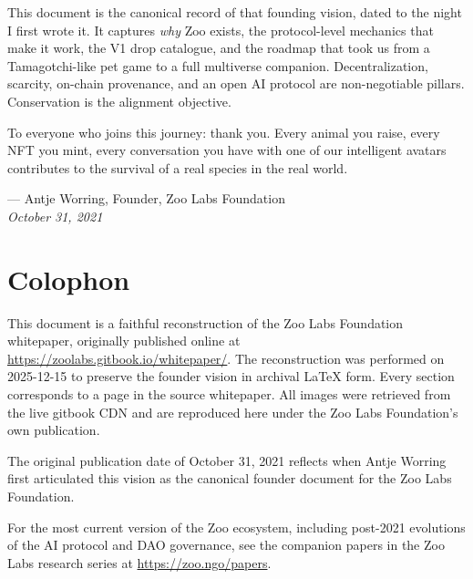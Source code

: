 \documentclass[11pt,letterpaper]{article}
\begin{document}
This document is the canonical record of that founding vision, dated to the night I first wrote it. It captures \emph{why} Zoo exists, the protocol-level mechanics that make it work, the V1 drop catalogue, and the roadmap that took us from a Tamagotchi-like pet game to a full multiverse companion. Decentralization, scarcity, on-chain provenance, and an open AI protocol are non-negotiable pillars. Conservation is the alignment objective.

To everyone who joins this journey: thank you. Every animal you raise, every NFT you mint, every conversation you have with one of our intelligent avatars contributes to the survival of a real species in the real world.

\vspace{0.4cm}
\noindent --- Antje Worring, Founder, Zoo Labs Foundation \\
\noindent \textit{October 31, 2021}

\vspace{1cm}

\tableofcontents

\clearpage
{}
\setcounter{page}{1}












\clearpage
\section*{Colophon}

This document is a faithful reconstruction of the Zoo Labs Foundation whitepaper, originally published online at \url{https://zoolabs.gitbook.io/whitepaper/}. The reconstruction was performed on 2025-12-15 to preserve the founder vision in archival LaTeX form. Every section corresponds to a page in the source whitepaper. All images were retrieved from the live gitbook CDN and are reproduced here under the Zoo Labs Foundation's own publication.

The original publication date of October 31, 2021 reflects when Antje Worring first articulated this vision as the canonical founder document for the Zoo Labs Foundation.

For the most current version of the Zoo ecosystem, including post-2021 evolutions of the AI protocol and DAO governance, see the companion papers in the Zoo Labs research series at \url{https://zoo.ngo/papers}.
\end{document}
